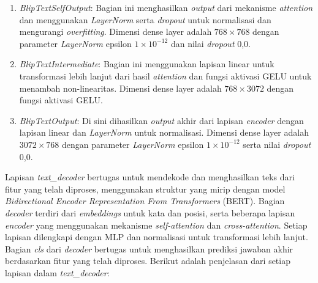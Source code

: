 \begin{enumerate}
  \item \textit{BlipTextSelfOutput}: Bagian ini menghasilkan \textit{output} dari mekanisme \textit{attention} dan menggunakan \textit{LayerNorm} serta \textit{dropout} untuk normalisasi dan mengurangi \textit{overfitting}. Dimensi dense layer adalah $768 \times 768$ dengan parameter \textit{LayerNorm} epsilon $1 \times 10^{-12}$ dan nilai \textit{dropout} 0,0.

  \item \textit{BlipTextIntermediate}: Bagian ini menggunakan lapisan linear untuk transformasi lebih lanjut dari hasil \textit{attention} dan fungsi aktivasi GELU untuk menambah non-linearitas. Dimensi dense layer adalah $768 \times 3072$ dengan fungsi aktivasi GELU.

  \item \textit{BlipTextOutput}: Di sini dihasilkan \textit{output} akhir dari lapisan \textit{encoder} dengan lapisan linear dan \textit{LayerNorm} untuk normalisasi. Dimensi dense layer adalah $3072 \times 768$ dengan parameter \textit{LayerNorm} epsilon $1 \times 10^{-12}$ serta nilai \textit{dropout} 0,0.


\end{enumerate}



\par Lapisan \textit{text\_decoder} bertugas untuk mendekode dan menghasilkan teks dari fitur yang telah diproses, menggunakan struktur yang mirip dengan model \textit{Bidirectional Encoder Representation From Transformers} (BERT). Bagian \textit{decoder} terdiri dari \textit{embeddings} untuk kata dan posisi, serta beberapa lapisan \textit{encoder} yang menggunakan mekanisme \textit{self-attention} dan \textit{cross-attention}. Setiap lapisan dilengkapi dengan MLP dan normalisasi untuk transformasi lebih lanjut. Bagian \textit{cls} dari \textit{decoder} bertugas untuk menghasilkan prediksi jawaban akhir berdasarkan fitur yang telah diproses. Berikut adalah penjelasan dari setiap lapisan dalam \textit{text\_decoder}:

